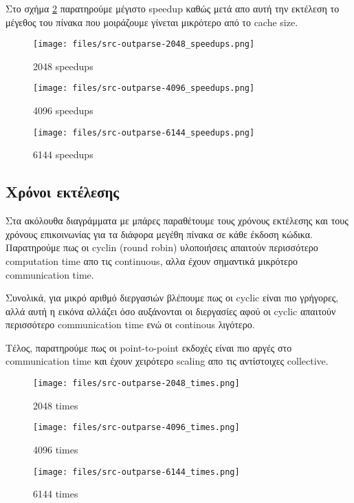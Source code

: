 Στο σχήμα \ref{fig:4096_speed} παρατηρούμε μέγιστο speedup καθώς μετά απο αυτή
την εκτέλεση το μέγεθος του πίνακα που μοιράζουμε γίνεται μικρότερο από το
cache size.

\begin{figure}[H]
    \centering
    \texttt{[image: files/src-outparse-2048\_speedups.png]}
    \caption{2048 speedups}
    \label{fig:2048_speed}
\end{figure}

\begin{figure}[H]
    \centering
    \texttt{[image: files/src-outparse-4096\_speedups.png]}
    \caption{4096 speedups}
    \label{fig:4096_speed}
\end{figure}

\begin{figure}[H]
    \centering
    \texttt{[image: files/src-outparse-6144\_speedups.png]}
    \caption{6144 speedups}
    \label{fig:6144_speed}
\end{figure}




\subsection{Χρόνοι εκτέλεσης}

Στα ακόλουθα διαγράμματα με μπάρες  παραθέτουμε τους χρόνους εκτέλεσης και τους
χρόνους επικοινωνίας για τα διάφορα μεγέθη πίνακα σε κάθε έκδοση κώδικα.
Παρατηρούμε πως οι cyclin (round robin) υλοποιήσεις απαιτούν περισσότερο
computation time απο τις continuous, αλλα έχουν σημαντικά μικρότερο
communication time.

Συνολικά, για μικρό αριθμό διεργασιών βλέπουμε πως οι cyclic είναι πιο γρήγορες,
αλλά αυτή η εικόνα αλλάζει όσο αυξάνονται οι διεργασίες αφού οι cyclic απαιτούν
περισσότερο communication time ενώ οι continous λιγότερο. 

Τέλος, παρατηρούμε πως οι point-to-point εκδοχές είναι πιο αργές στο
communication time και έχουν χειρότερο scaling απο τις αντίστοιχες collective. 

\begin{figure}[H]
    \centering
    \texttt{[image: files/src-outparse-2048\_times.png]}
    \caption{2048 times}
    \label{fig:2048_time}
\end{figure}

\begin{figure}[H]
    \centering
    \texttt{[image: files/src-outparse-4096\_times.png]}
    \caption{4096 times}
    \label{fig:4096_time}
\end{figure}

\begin{figure}[H]
    \centering
    \texttt{[image: files/src-outparse-6144\_times.png]}
    \caption{6144 times}
    \label{fig:6144_time}
\end{figure}






